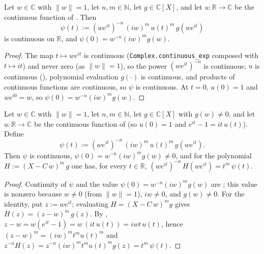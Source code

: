 \begin{lemma}
    \label{lem:psi-continuous}
    \leanok
    Let $w \in \mathbb{C}$ with $\|w\| = 1$, let $n, m \in \mathbb{N}$, let
    $g \in \mathbb{C}[X]$, and let $u : \mathbb{R} \to \mathbb{C}$ be the
    continuous function of . Then
    \[
        \psi(t) := (w e^{i t})^{-n}\,(i w)^{m}\, u(t)^{m}\, g(w e^{i t})
    \]
    is continuous on $\mathbb{R}$, and $\psi(0) = w^{-n}(i w)^{m} g(w)$.
\end{lemma}
\begin{proof}
    The map $t \mapsto w e^{i t}$ is continuous (\texttt{Complex.continuous\_exp}
    composed with $t \mapsto i t$) and never zero (as $\|w\| = 1$), so the power
    $(w e^{i t})^{-n}$ is continuous; $u$ is continuous (),
    polynomial evaluation $g(\cdot)$ is continuous, and products of continuous
    functions are continuous, so $\psi$ is continuous. At $t = 0$, $u(0) = 1$ and
    $w e^{i 0} = w$, so $\psi(0) = w^{-n}(i w)^{m} g(w)$.
\end{proof}

\begin{lemma}
    \label{lem:circle-root-even-psi}
    Let $w \in \mathbb{C}$ with $\|w\| = 1$, let $n, m \in \mathbb{N}$, let
    $g \in \mathbb{C}[X]$ with $g(w) \neq 0$, and let $u : \mathbb{R} \to
    \mathbb{C}$ be the continuous function of  (so
    $u(0) = 1$ and $e^{i t} - 1 = i t\,u(t)$). Define
    \[
        \psi(t) := (w e^{i t})^{-n}\,(i w)^{m}\, u(t)^{m}\, g(w e^{i t}).
    \]
    Then $\psi$ is continuous, $\psi(0) = w^{-n}(i w)^{m} g(w) \neq 0$, and for
    the polynomial $H := (X - C\,w)^{m}\,g$ one has, for every $t \in \mathbb{R}$,
    $(w e^{i t})^{-n}\,H(w e^{i t}) = t^{m}\,\psi(t)$.
\end{lemma}
\begin{proof}
    Continuity of $\psi$ and the value $\psi(0) = w^{-n}(i w)^{m} g(w)$ are
    ; this value is nonzero because $w \neq 0$ (from
    $\|w\| = 1$), $i w \neq 0$, and $g(w) \neq 0$. For the identity, put
    $z := w e^{i t}$; evaluating $H = (X - C\,w)^{m} g$ gives
    $H(z) = (z - w)^{m}\,g(z)$. By ,
    $z - w = w(e^{i t} - 1) = w\,(i t\,u(t)) = i w t\,u(t)$, hence
    $(z - w)^{m} = (i w)^{m} t^{m} u(t)^{m}$ and
    $z^{-n} H(z) = z^{-n}(i w)^{m} t^{m} u(t)^{m} g(z) = t^{m}\,\psi(t)$.
\end{proof}

